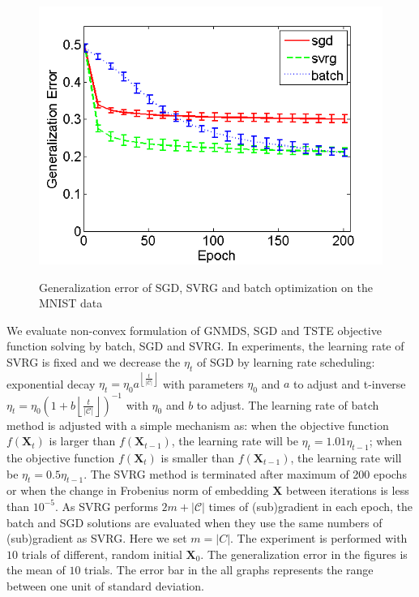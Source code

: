 \documentclass[letterpaper]{article}
\begin{document}
\begin{figure}
{				\includegraphics[scale=0.33]{MNIST_TSTE_200_test.png}
			}
			\caption{Generalization error of SGD, SVRG and batch optimization on the MNIST data}
			\label{fig:2} %
		\end{figure}

		We evaluate non-convex formulation of GNMDS, SGD and TSTE objective function solving by batch, SGD and SVRG. In experiments, the learning rate of SVRG is fixed and we decrease the $\eta_t$ of SGD by learning rate scheduling: exponential decay $\eta_t = \eta_0 a^{\left \lfloor \frac{t}{|\mathcal{C}|} \right \rfloor}$ with parameters $\eta_0$ and $a$ to adjust and t-inverse $\eta_t = \eta_0(1 + b\left \lfloor \frac{t}{|\mathcal{C}|} \right \rfloor)^{-1}$ with $\eta_0$ and $b$ to adjust. The learning rate of batch method is adjusted with a simple mechanism as: when the objective function $f(\mathbf{X}_t)$ is larger than $f(\mathbf{X}_{t-1})$, the learning rate will be $\eta_t=1.01\eta_{t-1}$; when the objective function $f(\mathbf{X}_t)$ is smaller than $f(\mathbf{X}_{t-1})$, the learning rate will be $\eta_t=0.5\eta_{t-1}$. 
		The SVRG method is terminated after maximum of 200 epochs or when the change in Frobenius norm of embedding $\mathbf{X}$ between iterations is less than $10^{-5}$. As SVRG performs $2m+|\mathcal{C}|$ times of (sub)gradient in each epoch, the batch and SGD solutions are evaluated when they use the same numbers of (sub)gradient as SVRG. Here we set $m=|C|$. The experiment is performed with $10$ trials of different, random initial $\mathbf{X}_0$. The generalization error in the figures is the mean of $10$ trials. The error bar in the all graphs represents the range between one unit of standard deviation.
\end{document}

